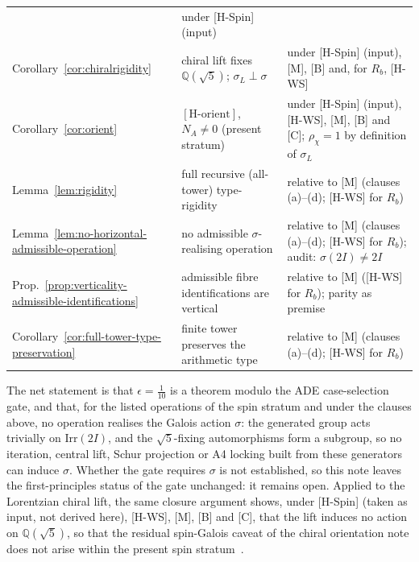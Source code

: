 \documentclass[11pt]{article}
\theoremstyle{definition}
\theoremstyle{remark}
\begin{document}
\begin{center}
\begin{tabular}{@{}p{}p{}p{}@{}}
        & under [H-Spin] (input)\\
        Corollary~\ref{cor:chiralrigidity} & chiral lift fixes $\mathbb{Q}(\sqrt{5})$; $\sigma_L\perp\sigma$
        & under [H-Spin] (input), [M], [B] and, for $R_b$, [H-WS]\\
        Corollary~\ref{cor:orient} & $[\mathrm{H\text{-}orient}]$, $N_A\neq0$ (present stratum)
        & under [H-Spin] (input), [H-WS], [M], [B] and [C]; $\rho_\chi=1$ by definition of $\sigma_L$\\
        Lemma~\ref{lem:rigidity} & full recursive (all-tower) type-rigidity & relative to [M] (clauses (a)--(d); [H-WS] for $R_b$)\\
        Lemma~\ref{lem:no-horizontal-admissible-operation} & no admissible $\sigma$-realising operation
        & relative to [M] (clauses (a)--(d); [H-WS] for $R_b$); audit: $\sigma(2I)\neq2I$\\
        Prop.~\ref{prop:verticality-admissible-identifications} & admissible fibre identifications are vertical
        & relative to [M] ([H-WS] for $R_b$); parity as premise\\
        Corollary~\ref{cor:full-tower-type-preservation} & finite tower preserves the arithmetic type
        & relative to [M] (clauses (a)--(d); [H-WS] for $R_b$)\\
        \hline
      \end{tabular}
    \end{center}

    The net statement is that $\epsilon=\tfrac{1}{10}$ is a theorem modulo the ADE case-selection gate, and that, for the
    listed operations of the spin stratum and under the clauses above, no operation realises the Galois action $\sigma$:
    the generated group acts trivially on $\mathrm{Irr}(2I)$, and the $\sqrt{5}$-fixing automorphisms form a subgroup, so
    no iteration, central lift, Schur projection or A4 locking built from these generators can induce $\sigma$.
    Whether the gate requires $\sigma$ is not established, so this note leaves the first-principles status of the gate
    unchanged: it remains open.
    Applied to the Lorentzian chiral lift, the same closure argument shows, under [H-Spin] (taken as input, not derived
here), [H-WS], [M], [B] and [C], that the lift induces no action on $\mathbb{Q}(\sqrt{5})$, so that the residual
    spin-Galois caveat of the chiral orientation note does not arise within the present spin stratum~\cite{Beau2026cho}.
\end{document}
